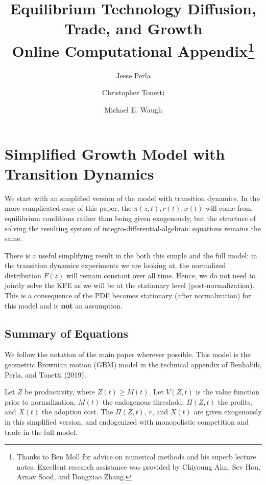 \documentclass[11pt]{article}
\begin{document}
\title{Equilibrium Technology Diffusion, Trade, and Growth\\Online Computational Appendix\thanks{Thanks to Ben Moll for advice on numerical methods and his superb lecture notes.  Excellent research assistance was provided by Chiyoung Ahn, Sev Hou, Arnav Sood, and Dongxiao Zhang.}}
\author{Jesse Perla \and Christopher Tonetti \and Michael E. Waugh}
\maketitle

\section{Simplified Growth Model with Transition Dynamics}
We start with an simplified version of the model with transition dynamics.  In the more complicated case of this paper, the $\pi(z,t), r(t), x(t)$ will come from equilibrium conditions rather than being given exogenously, but the structure of solving the resulting system of integro-differential-algebraic equations remains the same.

There is a useful simplifying result in the both this simple and the full model: in the transition dynamics experiments we are looking at, the normalized distribution $F(z)$ will remain constant over all time.  Hence, we do not need to jointly solve the KFE as we will be at the stationary level (post-normalization).  This is a consequence of the PDF becomes stationary (after normalization) for this model and is \textbf{not} an assumption.

\subsection{Summary of Equations}\label{sec:summary-simple}
We follow the notation of the main paper wherever possible.  This model is the geometric Brownian motion (GBM) model in the technical appendix of Benhabib, Perla, and Tonetti (2019).

Let $Z$ be productivity, where $Z(t) \geq M(t)$.  Let $V(Z,t)$ is the value function prior to normalization, $M(t)$ the endogenous threshold, $\Pi(Z,t)$ the profits, and $X(t)$ the adoption cost.  The $\Pi(Z,t)$, $r$, and $X(t)$ are given exogenously in this simplified version, and endogenized with monopolistic competition and trade in the full model.
\end{document}
